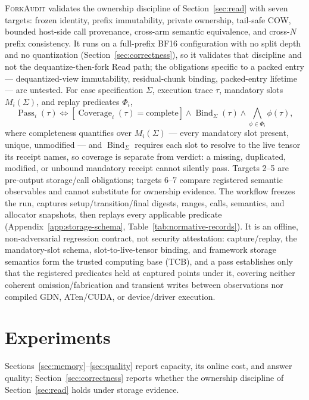 \documentclass{article}
\newcommand{\method}{\textsc{ForkAudit}}
\begin{document}
\method{} validates the ownership discipline of Section~\ref{sec:read} with
seven targets: frozen identity, prefix immutability, private ownership,
tail-safe COW, bounded host-side call provenance, cross-arm semantic
equivalence, and cross-\(N\) prefix consistency. It runs on a full-prefix BF16
configuration with no split depth and no quantization
(Section~\ref{sec:correctness}), so it validates that discipline and not the
dequantize-then-fork Read path; the obligations specific to a packed entry ---
dequantized-view immutability, residual-chunk binding, packed-entry lifetime
--- are untested.
For case specification \(\Sigma\), execution trace \(\tau\), mandatory slots
\(M_i(\Sigma)\), and replay predicates \(\Phi_i\),
\begin{equation}
  \operatorname{Pass}_i(\tau)\Longleftrightarrow
  [\operatorname{Coverage}_i(\tau)=\mathrm{complete}]
  \wedge\operatorname{Bind}_{\Sigma}(\tau)
  \wedge\bigwedge_{\phi\in\Phi_i}\phi(\tau),
\end{equation}
where completeness quantifies over \(M_i(\Sigma)\) --- every mandatory slot
present, unique, unmodified --- and \(\operatorname{Bind}_{\Sigma}\) requires
each slot to resolve to the live tensor its receipt names, so coverage is
separate from verdict: a missing, duplicated, modified, or unbound mandatory
receipt cannot silently pass.  Targets 2--5 are pre-output
storage/call obligations; targets 6--7 compare registered semantic observables
and cannot substitute for ownership evidence.  The workflow freezes the run,
captures setup/transition/final digests, ranges, calls, semantics, and
allocator snapshots, then replays every applicable predicate
(Appendix~\ref{app:storage-schema}, Table~\ref{tab:normative-records}).  It is
an offline, non-adversarial regression contract, not security attestation:
capture/replay, the mandatory-slot schema, slot-to-live-tensor binding, and
framework storage semantics form the trusted computing base (TCB), and a pass
establishes only that the registered predicates held at captured points under
it, covering neither coherent omission/fabrication and transient writes between
observations nor compiled GDN, ATen/CUDA, or device/driver execution.

\section{Experiments}
\label{sec:experiments}
\label{sec:protocol}

Sections~\ref{sec:memory}--\ref{sec:quality} report capacity, its online cost,
and answer quality; Section~\ref{sec:correctness} reports whether the ownership
discipline of Section~\ref{sec:read} holds under storage evidence.
\end{document}
